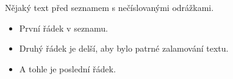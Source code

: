 Nějaký text před seznamem s nečíslovanými odrážkami.
\begin{itemize}
   \item První řádek v seznamu.
   \item Druhý řádek je delší, aby bylo
     patrné zalamování textu.
   \item A tohle je poslední řádek.
\end{itemize}